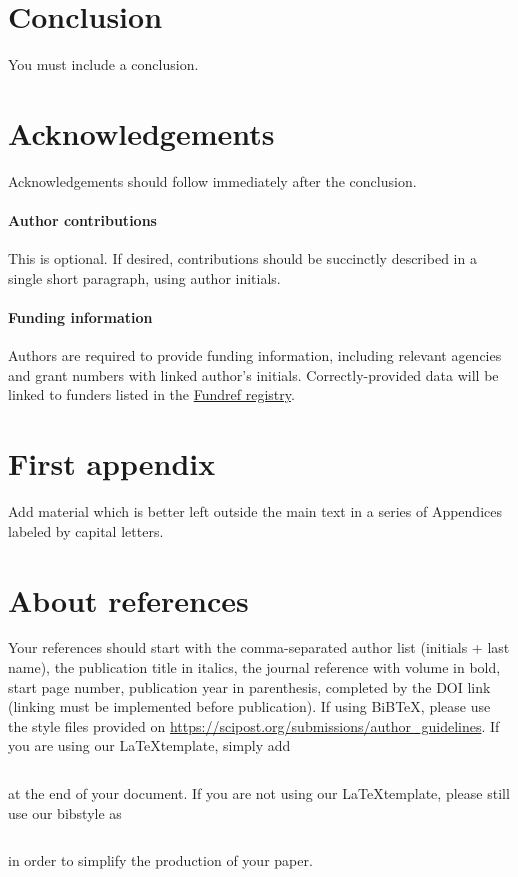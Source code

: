 \documentclass[submission, PhysCodeb]{SciPost}
\begin{document}
\section{Conclusion}
You must include a conclusion.

\section*{Acknowledgements}
Acknowledgements should follow immediately after the conclusion.

\paragraph{Author contributions}
This is optional. If desired, contributions should be succinctly described in a single short paragraph, using author initials.

\paragraph{Funding information}
Authors are required to provide funding information, including relevant agencies and grant numbers with linked author's initials. Correctly-provided data will be linked to funders listed in the \href{https://www.crossref.org/services/funder-registry/}{\sf Fundref registry}.


\begin{appendix}

\section{First appendix}
Add material which is better left outside the main text in a series of Appendices labeled by capital letters.

\section{About references}
Your references should start with the comma-separated author list (initials + last name), the publication title in italics, the journal reference with volume in bold, start page number, publication year in parenthesis, completed by the DOI link (linking must be implemented before publication). If using BiBTeX, please use the style files provided  on \url{https://scipost.org/submissions/author_guidelines}. If you are using our \LaTeX template, simply add
\begin{verbatim}

\end{verbatim}
at the end of your document. If you are not using our \LaTeX template, please still use our bibstyle as
\begin{verbatim}

\end{verbatim}
in order to simplify the production of your paper.
\end{appendix}
\end{document}
